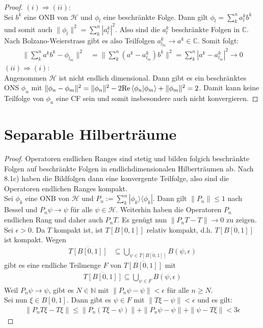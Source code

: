\documentclass[a4paper,12pt]{article}
\newcommand{\brak}{}
\newcommand{\klam}{}
\newcommand{\oper}{}
\newcommand{\tecxt}{}
\begin{document}
\begin{proof}
$(i)\Rightarrow(ii)$:\\
Sei $b^k$ eine ONB von $\mathcal{H}$ und $\phi_l$ eine beschränkte Folge. Dann gilt $\phi_l=\sum_k^na_l^kb^k$ und somit auch $\|\phi_l\|^2=\sum_k^n|a_l^k|^2$. Also sind die $a_l^k$ beschränkte Folgen in $\mathbb{C}$. Nach Bolzano-Weierstrass gibt es also Teilfolgen $a_{l_m}^k\rightarrow a^k\in\mathbb{C}$. Somit folgt:
\begin{align*}
\|\sum_k^n a^kb^k-\phi_{l_m}\|^2&=\|\sum_k^n (a^k-a_{l_m}^k)b^k\|^2=\sum_k^n|a^k-a_{l_m}^k|^2\rightarrow 0
\end{align*}
$(ii)\Rightarrow(i)$:\\
Angenommen $\mathcal{H}$ ist nicht endlich dimensional. Dann gibt es ein beschränktes ONS $\phi_n$ mit $\|\phi_n-\phi_m\|^2=\|\phi_n\|^2-2\tecxt\text{Re\,}\brak\langle {\phi_n}| {\phi_m}\rangle+\|\phi_m\|^2=2$. Damit kann keine Teilfolge von $\phi_n$ eine CF sein und somit insbesondere auch nicht konvergieren. 
\end{proof}
\section{Separable Hilberträume}
\begin{proof}
Operatoren endlichen Ranges sind stetig und bilden folgich beschränkte Folgen auf beschränkte Folgen in endlichdimensionalen Hilberträumen ab. Nach 8.1c) haben die Bildfolgen dann eine konvergente Teilfolge, also sind die Operatoren endlichen Ranges kompakt. \\
Sei $\phi_k$ eine ONB von $\mathcal{H}$ und $P_n:=\sum_k^n\oper |\phi_k\rangle\langle \phi_k|$. Dann gilt $\|P_n\|\le 1$ nach Bessel und $P_n\psi\rightarrow\psi$ für alle $\psi\in\mathcal{H}$. Weiterhin haben die Operatoren $P_n$ endlichen Rang und daher auch $P_nT$. Es genügt nun $\|P_nT-T\|\rightarrow 0$ zu zeigen. \\
Sei $\epsilon>0$. Da $T$ kompakt ist, ist $T\klam\left[ {B\klam\left[ {0,1} \right]} \right]$ relativ kompakt, d.h. $\overline{T\klam\left[ {B\klam\left[ {0,1} \right]} \right]}$ ist kompakt. Wegen
\begin{align*}
\overline{T\klam\left[ {B\klam\left[ {0,1} \right]} \right]}&\subseteq \bigcup_{\psi\in\overline{T\klam\left[ {B\klam\left[ {0,1} \right]} \right]}}B(\psi,\epsilon)
\end{align*}
gibt es eine endliche Teilmenge $F$ von $\overline{T\klam\left[ {B\klam\left[ {0,1} \right]} \right]}$ mit 
\begin{align*}
\overline{T\klam\left[ {B\klam\left[ {0,1} \right]} \right]}\subseteq \bigcup_{\psi\in F} B(\psi,\epsilon)
\end{align*}
Weil $P_n\psi\rightarrow\psi$, gibt es $N\in\mathbb{N}$ mit $\|P_n\psi-\psi\|<\epsilon $ für alle $n\ge N$. \\
Sei nun $\xi\in B\klam\left[ {0,1} \right]$. Dann gibt es $\psi\in F$ mit $\|T\xi -\psi\|<\epsilon $ und es gilt:
\begin{align*}
\|P_nT\xi-T\xi\|\le\|P_n(T\xi-\psi)\|+\|P_n\psi-\psi\|+\|\psi-T\xi\|<3\epsilon
\end{align*}
\end{proof}
\end{document}
